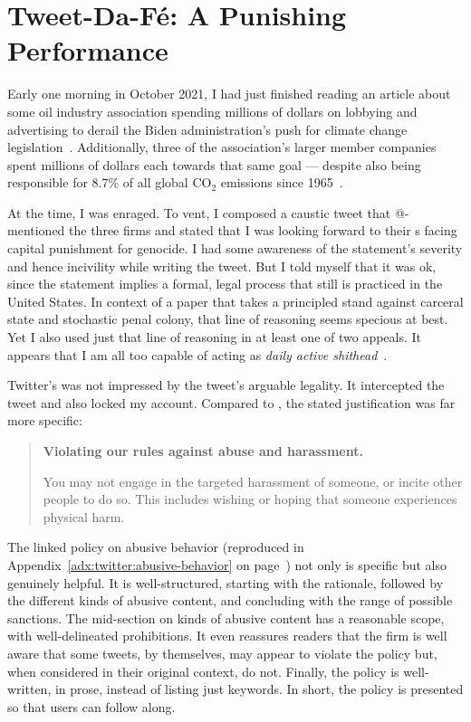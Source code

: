 
\section{Tweet-Da-F\'e: A Punishing Performance}
\label{sec:tweet:da:fe}

Early one morning in October 2021, I had just finished reading an article about
some oil industry association spending millions of dollars on lobbying and
advertising to derail the Biden administration's push for climate change
legislation~\cite{Tabuchi2021}. Additionally, three of the association's larger
member companies spent millions of dollars each towards that same goal ---
despite also being responsible for 8.7\% of all global CO$_2$ emissions since
1965~\cite{TaylorWatts2019}.

At the time, I was enraged. To vent, I composed a caustic tweet that @-mentioned
the three firms and stated that I was looking forward to their \CEO{}s facing
capital punishment for genocide. I had some awareness of the statement's
severity and hence incivility while writing the tweet. But I told myself that it
was ok, since the statement implies a formal, legal process that still is
practiced in the United States. In context of a paper that takes a principled
stand against carceral state and stochastic penal colony, that line of reasoning
seems specious at best. Yet I also used just that line of reasoning in at least
one of two appeals. It appears that I am all too capable of acting as
\emph{daily active shithead}~\cite{Sherman2021}.

Twitter's \AI{} was not impressed by the tweet's arguable legality. It
intercepted the tweet and also locked my account. Compared to \DALLE, the stated
justification was far more specific:
\begin{quote}
\openfat\textbf{Violating our rules against abuse and harassment.}

You may not engage in the targeted harassment of someone, or incite other people
to do so. This includes wishing or hoping that someone experiences physical
harm.\closefat{}
\end{quote}

\noindent{}The linked policy on abusive behavior (reproduced in
Appendix~\ref{adx:twitter:abusive-behavior} on
page~\pageref{adx:twitter:abusive-behavior}) not only is specific but also
genuinely helpful. It is well-structured, starting with the rationale, followed
by the different kinds of abusive content, and concluding with the range of
possible sanctions. The mid-section on kinds of abusive content has a reasonable
scope, with well-delineated prohibitions. It even reassures readers that the
firm is well aware that some tweets, by themselves, may appear to violate the
policy but, when considered in their original context, do not. Finally, the
policy is well-written, in prose, instead of listing just keywords. In short,
the policy is presented so that users can follow along.

